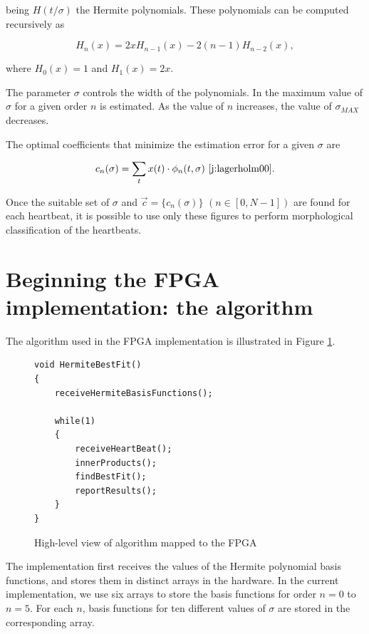 \documentclass[runningheads]{llncs}
\begin{document}
\noindent being $H(t/\sigma)$ the Hermite polynomials. These polynomials can be computed recursively as

\begin{equation}
H_n(x)=2xH_{n-1}(x)-2(n-1)H_{n-2}(x),
\end{equation}

\noindent where $H_0(x)=1$ and $H_1(x)=2x$.

The parameter $\sigma$ controls the width of the polynomials. In \cite{j:lagerholm00} the maximum value 
of $\sigma$ for a given order $n$ is estimated.  As the value of $n$ increases, the value of $\sigma_{MAX}$ decreases.

The optimal coefficients that minimize the estimation error for a given $\sigma$ are

\begin{equation}\label{eqn:c}
c_n(\sigma)=\sum_{t} x(t)\cdot \phi_n(t,\sigma) \textrm{~\cite{j:lagerholm00}.}
\end{equation}

Once the suitable set of $\sigma$ and $\vec{c}=\{c_n(\sigma)\}$  \mbox{$(n\in [0,N-1])$} are found for each heartbeat, 
it is possible to use only these figures to perform morphological classification of the heartbeats. 

\section{Beginning the FPGA implementation: the algorithm}

The algorithm used in the FPGA implementation is illustrated in 
Figure \ref{fig:FpgaAlgo}.
\begin{figure}
\begin{centering}
\begin{verbatim}
void HermiteBestFit()
{  
    receiveHermiteBasisFunctions();

    while(1)
    {
        receiveHeartBeat();
        innerProducts();
        findBestFit();
        reportResults();
    }
}
\end{verbatim}
\end{centering}
\caption{High-level view of algorithm mapped to the FPGA}
\label{fig:FpgaAlgo}
\end{figure}

The implementation first receives the values of the Hermite polynomial basis
functions, and  stores them in distinct arrays in the hardware.  In the
current implementation, we use six
arrays to store the basis functions for order $n=0$ to $n=5$.  For each
$n$, basis functions for ten different values of $\sigma$ are stored in the corresponding
array.  
\end{document}
